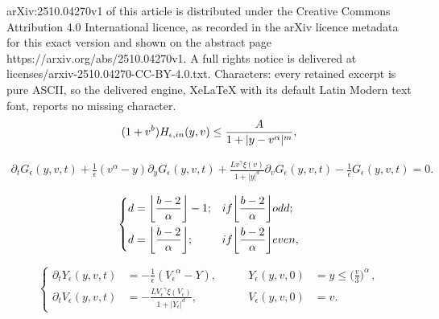 \documentclass[10pt,a4paper]{amsart}
\begin{document}
arXiv:2510.04270v1 of this article is distributed under the Creative Commons Attribution 4.0 International licence, as recorded in the arXiv licence metadata for this exact version and shown on the abstract page https://arxiv.org/abs/2510.04270v1. A full rights notice is delivered at licenses/arxiv-2510.04270-CC-BY-4.0.txt. Characters: every retained excerpt is pure ASCII, so the delivered engine, XeLaTeX with its default Latin Modern text font, reports no missing character.
\begin{align}\label{initial condition decay}
   (1+v^{b}) H_{\epsilon,\textup{in}}(y,v)\leq \frac{A}{1+|y-v^{\alpha}|^{m}},
\end{align}

\begin{align}\label{equation supersolution}
      \partial_{t}G_{\epsilon}(y,v,t)+\frac{1}{\epsilon}(v^{\alpha}-y)\partial_{y}G_{\epsilon}(y,v,t)+\frac{Lv^{\gamma}\xi(v)}{1+|y|^{d}}\partial_{v}G_{\epsilon}(y,v,t)-\frac{1}{\epsilon}G_{\epsilon}(y,v,t)=0.
\end{align}

  \begin{equation}\label{we need function to be even}
\left\{\begin{aligned}
d&=\bigg\lfloor\frac{b-2}{\alpha}\bigg\rfloor-1; &\textup{ if }\bigg\lfloor\frac{b-2}{\alpha}\bigg\rfloor& \textup{ odd; }\\
d&=\bigg\lfloor\frac{b-2}{\alpha}\bigg\rfloor;&\textup{ if }\bigg\lfloor\frac{b-2}{\alpha}\bigg\rfloor& \textup{ even, }
   \end{aligned}\right.
   \end{equation}

  \begin{equation}\label{the original characteristics}
\left\{\begin{aligned}
\partial_{t}{Y_{\epsilon}}(y,v,t)&=-\frac{1}{\epsilon}({V_{\epsilon}}^{\alpha}-Y), & \qquad {Y_{\epsilon}}(y,v,0)&=y\leq \big(\frac{v}{3}\big)^{\alpha}\,, \\
\partial_{t}{V_{\epsilon}}(y,v,t)&=-\frac{{L}{V_{\epsilon}}^{\gamma}\xi(V_{\epsilon})}{1+|{Y_{\epsilon}}|^{d}},& \qquad {V_{\epsilon}}(y,v,0)&=v.
   \end{aligned}\right.
   \end{equation}
\end{document}
